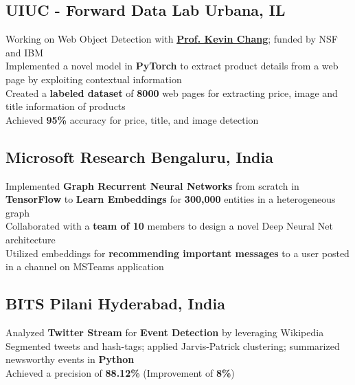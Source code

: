 \documentclass[]{Keval-resume}
\begin{document}
\subsection{UIUC - Forward Data Lab \hfill \normalfont U\lowercase{rbana}, IL}
\textbullet{} Working on Web Object Detection with \href{http://www.forwarddatalab.org/kevinccchang}{\textbf{Prof. Kevin Chang}}; funded by NSF and IBM \\
\textbullet{} Implemented a novel model in \textbf{PyTorch} to extract product details from a web page by exploiting contextual information \\
\textbullet{} Created a \textbf{labeled dataset} of \textbf{8000} web pages for extracting price, image and title information of products \\
\textbullet{} Achieved \textbf{95\%} accuracy for price, title, and image detection 
\sectionsep

\subsection{Microsoft Research \hfill \normalfont B\lowercase{engaluru}, I\lowercase{ndia}}
\textbullet{} Implemented \textbf{Graph Recurrent Neural Networks} from scratch in \textbf{TensorFlow} to \textbf{Learn Embeddings} for \textbf{300,000} entities in a heterogeneous graph \\
\textbullet{} Collaborated with a \textbf{team of 10} members to design a novel Deep Neural Net architecture \\
\textbullet{} Utilized embeddings for \textbf{recommending important messages} to a user posted in a channel on MSTeams application
\sectionsep

\subsection{BITS Pilani \hfill \normalfont H\lowercase{yderabad}, I\lowercase{ndia}}
\textbullet{} Analyzed \textbf{Twitter Stream} for \textbf{Event Detection} by leveraging Wikipedia \\
\textbullet{} Segmented tweets and hash-tags; applied Jarvis-Patrick clustering; summarized newsworthy events in \textbf{Python}\\
\textbullet{} Achieved a precision of \textbf{88.12\%} (Improvement of \textbf{8\%})
\sectionsep
\end{document}
